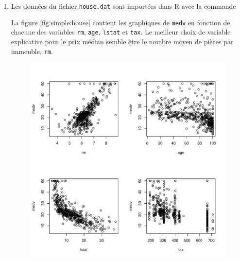 \begin{solution}{2.17}
    \begin{enumerate}
    \item Les données du fichier \texttt{house.dat} sont importées
      dans \textsf{R} avec la commande
\begin{knitrout}
\color{fgcolor}\begin{kframe}
\begin{alltt}
 \hlkwb{<-} \hlstd{(}\hlstd{,}  \hlstd{=} \hlstd{)}
\end{alltt}
\end{kframe}
\end{knitrout}
      La figure \ref{fig:simple:house} contient les graphiques de
      \texttt{medv} en fonction de chacune des variables \texttt{rm},
      \texttt{age}, \texttt{lstat} et \texttt{tax}. Le meilleur choix
      de variable explicative pour le prix médian semble être le
      nombre moyen de pièces par immeuble, \texttt{rm}.
      \begin{figure}
        \centering
\begin{knitrout}
\color{fgcolor}\begin{kframe}
\begin{alltt}
\hlstd{(} \hlstd{=} \hlstd{(}\hlstd{,} \hlstd{))}
 \hlopt{~}  \hlopt{+}  \hlopt{+}  \hlopt{+}     \hlstd{=} \hlstd{)}
\end{alltt}
\end{kframe}
\includegraphics[width=\maxwidth]{figure/unnamed-chunk-25-1}


\end{knitrout}
\end{figure}
\end{enumerate}
\end{solution}
